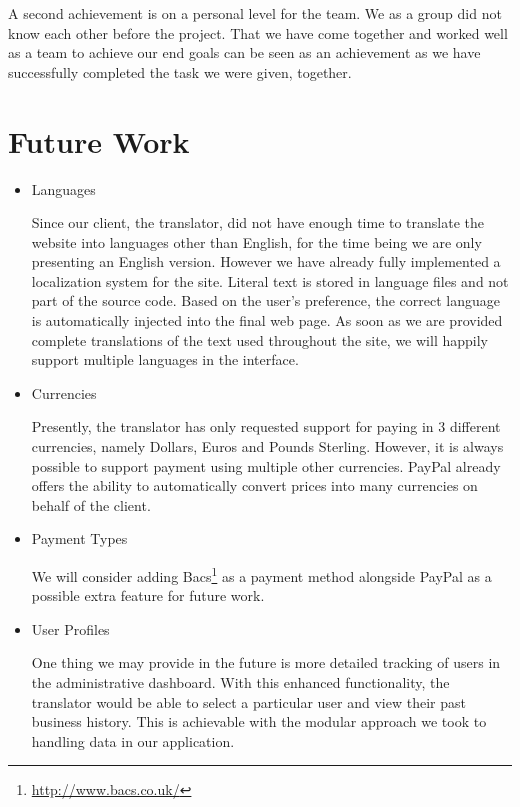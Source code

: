 \documentclass{l3proj}
\begin{document}
A second achievement is on a personal level for the team. We as a group did not know each other before the project.
That we have come together and worked well as a team to achieve our end goals can be seen as an achievement as we have
successfully completed the task we were given, together.

\section{Future Work}
\label{sect:fut-work}
\begin{itemize}
\item{Languages}

Since our client, the translator, did not have enough time to translate the website into languages other 
than English, for the time being we are only presenting an English version. However we have already fully implemented a localization system
for the site. Literal text is stored in language files and not part of the
source code. Based on the user's preference, the correct language is automatically
injected into the final web page. As soon as we are provided complete
translations of the text used throughout the site, we will happily support multiple
languages in the interface.

\item{Currencies}

Presently, the translator has only requested support for paying in 3 different
currencies, namely Dollars, Euros and Pounds Sterling. 
However, it is always possible to support payment using multiple other currencies.
PayPal already offers the ability to automatically convert prices into many
currencies on behalf of the client.

\item{Payment Types}

We will consider adding Bacs\footnote{\url{http://www.bacs.co.uk/}} as a payment method alongside PayPal as a possible extra feature for future work.

\item{User Profiles}

One thing we may provide in the future is more detailed tracking of users in the
administrative dashboard. With this enhanced functionality, the translator would
be able to select a particular user and view their past business history.
This is achievable with the modular approach we took to handling
data in our application.
 
\end{itemize}
\end{document}
